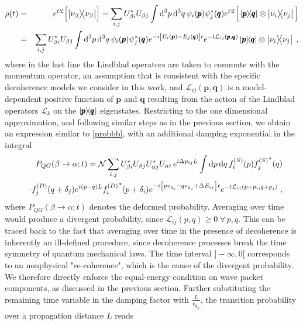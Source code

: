 \documentclass[11pt]{article}
\begin{document}
\begin{eqnarray}
    \rho(t) &=& e^{t \mathfrak{L}} \qty[\ketbra{\nu_\beta}{\nu_\beta}] = \sum_{i,j} U_{\beta i}^* U_{\beta j} \int \text{d}^3p \,\text{d}^3 q\, \psi_i\qty(\pmb{p})\psi_j^*\qty(\pmb{q}) e^{t\mathfrak{L}}\Big[\ketbra{\pmb{p}}{\pmb{q}}\otimes \ketbra{\nu_i}{\nu_j}\Big]\nonumber\\
    &=& \sum_{i,j} U_{\beta i}^* U_{\beta j} \int \text{d}^3p \,\text{d}^3 q\,\psi_i\qty(\pmb{p})\psi_j^*\qty(\pmb{q})e^{-i\qty[E_i\qty(\pmb{p})-E_j\qty(\pmb{q})]t}e^{-t\mathcal{L}_{ij}(\pmb{p},\pmb{q})} \ketbra{\pmb{p}}{\pmb{q}}\otimes \ketbra{\nu_i}{\nu_j}\;, \label{time evolution decohe}
\end{eqnarray}
where in the last line the Lindblad operators are taken to commute with the momentum operator, an assumption that is consistent with the specific decoherence models we consider in this work, and $\mathcal{L}_{ij}(\pmb{p},\pmb{q})$ is a model-dependent positive function of $\pmb{p}$ and $\pmb{q}$ resulting from the action of the Lindblad operators $\mathcal{L}_k$ on the $\ketbra{\pmb{p}}{\pmb{q}}$ eigenstates. Restricting to the one dimensional approximation, and following similar steps as in the previous section, we obtain an expression similar to \eqref{probbb}, with an additional damping exponential in the integral
\begin{eqnarray}
    &&P_{QG}(\beta\to\alpha;t) = \mathcal{N}\sum_{i,j} U^*_{\beta i} U_{\beta j} U^*_{\alpha j} U_{\alpha i} \,e^{i\Delta p_{ij}L} \int \text{d}p \,\text{d} q\,f_i^{(S)}(p) {f_j^{(S)}}^*(q) \nonumber \\ &&\cdot f_j^{(D)}(q+\delta_j) e^{i(p-q)L} {f_i^{(D)}}^*(p+\delta_i) e^{-i\qty[pv_{g_i}-qv_{g_j}+\Delta E_{ij}]t} e^{-t \mathcal{L}_{ij}(p+p_i,q+p_j)}\;,
\end{eqnarray}
where $P_{QG}(\beta\to\alpha;t)$ denotes the deformed probability. Averaging over time would produce a divergent probability, since $\mathcal{L}_{ij}(p,q)\geq 0\;\forall\,p,q$. This can be traced back to the fact that averaging over time in the presence of decoherence is inherently an ill-defined procedure, since decoherence processes break the time symmetry of quantum mechanical laws. The time interval $]-\infty,0[$ corresponds to an nonphysical "re-coherence", which is the cause of the divergent probability. We therefore directly enforce the equal-energy condition on wave packet components, as discussed in the previous section. Further substituting the remaining time variable in the damping factor with $\frac{L}{v_{g_{ij}}}$, the transition probability over a propagation distance $L$ reads
\end{document}
